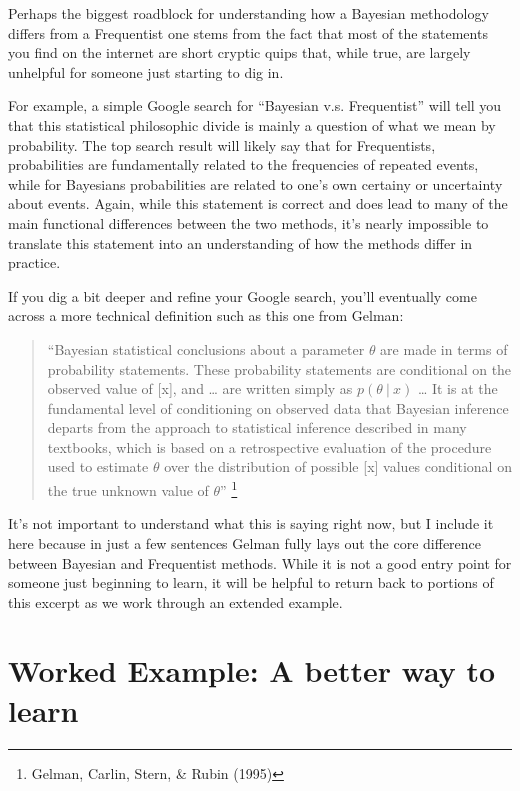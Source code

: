 \documentclass[12pt,twoside]{reedthesis}
\begin{document}
Perhaps the biggest roadblock for understanding how a Bayesian methodology differs from a Frequentist one stems from the fact that most of the statements you find on the internet are short cryptic quips that, while true, are largely unhelpful for someone just starting to dig in.

For example, a simple Google search for ``Bayesian v.s. Frequentist'' will tell you that this statistical philosophic divide is mainly a question of what we mean by probability. The top search result will likely say that for Frequentists, probabilities are fundamentally related to the frequencies of repeated events, while for Bayesians probabilities are related to one's own certainy or uncertainty about events. Again, while this statement is correct and does lead to many of the main functional differences between the two methods, it's nearly impossible to translate this statement into an understanding of how the methods differ in practice.

If you dig a bit deeper and refine your Google search, you'll eventually come across a more technical definition such as this one from Gelman:
\begin{quote}
``Bayesian statistical conclusions about a parameter \(\theta\) are made in terms of probability statements. These probability statements are conditional on the observed value of {[}x{]}, and \ldots{} are written simply as \(p(\theta \ | \ x)\) \ldots{} It is at the fundamental level of conditioning on observed data that Bayesian inference departs from the approach to statistical inference described in many textbooks, which is based on a retrospective evaluation of the procedure used to estimate \(\theta\) over the distribution of possible {[}x{]} values conditional on the true unknown value of \(\theta\)'' \footnote{Gelman, Carlin, Stern, \& Rubin (1995)}
\end{quote}
It's not important to understand what this is saying right now, but I include it here because in just a few sentences Gelman fully lays out the core difference between Bayesian and Frequentist methods. While it is not a good entry point for someone just beginning to learn, it will be helpful to return back to portions of this excerpt as we work through an extended example.

\hypertarget{worked-example-a-better-way-to-learn}{%
\section{Worked Example: A better way to learn}\label{worked-example-a-better-way-to-learn}}
\end{document}
